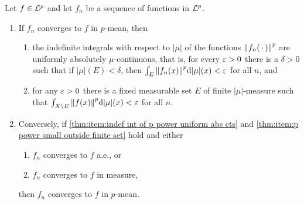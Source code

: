 \begin{theorem}
Let $f\in{\cal L}^p$ and let $f_n$ be a sequence of functions in ${\cal L}^p$.
\begin{enumerate}[label=\Roman*),ref=\Roman*)]
    \item\label{thm:cond:converge p mean}
    If $f_n$ converges to $f$ in $p$-mean, then
    \begin{enumerate}[label=\arabic*),ref=\arabic*)]
        \item\label{thm:item:indef int of p power uniform abs cts}
        the indefinite integrals with respect to $|\mu|$ of the functions $\norm{f_n(\,\cdot\,)}^p$ are uniformly absolutely $\mu$-continuous, that is, for every $\varepsilon>0$ there is a $\delta>0$ such that if $|\mu|(E)<\delta$, then $\int_E\norm{f_n(x)}^p\dd|\mu|(x)<\varepsilon$ for all $n$, and
        
        \item\label{thm:item:p power small outside finite set}
        for any $\varepsilon>0$ there is a fixed measurable set $E$ of finite $|\mu|$-measure such that $\int_{X\setminus E}\norm{f(x)}^p\dd|\mu|(x)<\varepsilon$ for all $n$.
    \end{enumerate}
    
    \item\label{thm:cond:converge p mean converse}
    Conversely, if \ref{thm:item:indef int of p power uniform abs cts} and \ref{thm:item:p power small outside finite set} hold and either
    \begin{enumerate}[label=3\alph*),ref=3\alph*)]
        \item\label{thm:item:vitali thm}
        $f_n$ converges to $f$ a.e., or
        \item\label{thm:item:Lp convergence thm}
        $f_n$ converges to $f$ in measure, 
    \end{enumerate}
    then $f_n$ converges to $f$ in $p$-mean.
\end{enumerate}
\end{theorem}


